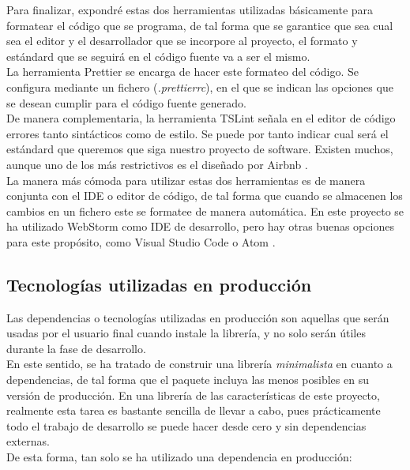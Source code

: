  Para finalizar, expondré estas dos herramientas utilizadas básicamente para formatear el código que se programa, de tal forma que se garantice que sea cual sea el editor y el desarrollador que se incorpore al proyecto, el formato y estándard que se seguirá en el código fuente va a ser el mismo. \\
 
 La herramienta Prettier \cite{prettier} se encarga de hacer este formateo del código. Se configura mediante un fichero (\textit{.prettierrc}), en el que se indican las opciones que se desean cumplir para el código fuente generado. \\
 
 De manera complementaria, la herramienta TSLint \cite{tslint} señala en el editor de código errores tanto sintácticos como de estilo. Se puede por tanto indicar cual será el estándard que queremos que siga nuestro proyecto de software. Existen muchos, aunque uno de los más restrictivos es el diseñado por Airbnb \cite{airbnbjs}. \\
 
 La manera más cómoda para utilizar estas dos herramientas es de manera conjunta con el IDE o editor de código, de tal forma que cuando se almacenen los cambios en un fichero este se formatee de manera automática. En este proyecto se ha utilizado WebStorm \cite{webstorm} como IDE de desarrollo, pero hay otras buenas opciones para este propósito, como Visual Studio Code \cite{vscode} o Atom \cite{atom}.

\subsection{Tecnologías utilizadas en producción}

Las dependencias o tecnologías utilizadas en producción son aquellas que serán usadas por el usuario final cuando instale la librería, y no solo serán útiles durante la fase de desarrollo. \\

En este sentido, se ha tratado de construir una librería \textit{minimalista} en cuanto a dependencias, de tal forma que el paquete incluya las menos posibles en su versión de producción. En una librería de las características de este proyecto, realmente esta tarea es bastante sencilla de llevar a cabo, pues prácticamente todo el trabajo de desarrollo se puede hacer desde cero y sin dependencias externas.\\

De esta forma, tan solo se ha utilizado una dependencia en producción:

